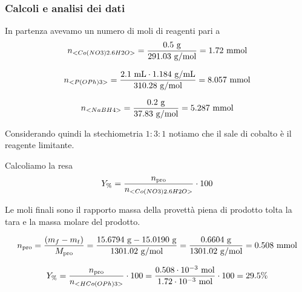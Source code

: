 \subsubsection{Calcoli e analisi dei dati}



In partenza avevamo un numero di moli di reagenti pari a
\[ n_{<Co(NO3)2.6H2O>}=\frac{0.5 \mathrm{~g}}{291.03 \mathrm{~g} / \mathrm{mol}}= 1.72 \mathrm{~mmol} \]

\[ n_{<P(OPh)3>}=\frac{2.1 \mathrm{~mL} \cdot 1.184 \mathrm{~g} / \mathrm{mL} }{310.28 \mathrm{~g} / \mathrm{mol}}= 8.057 \mathrm{~mmol} \]

\[ n_{<NaBH4>}=\frac{0.2 \mathrm{~g}  }{37.83 \mathrm{~g} / \mathrm{mol}}= 5.287 \mathrm{~mmol} \]

Considerando quindi la stechiometria $1: 3: 1$ notiamo che il sale di cobalto è il reagente limitante. 



Calcoliamo la resa 
\[ Y_\% = \frac{n_\text{pro}}{n_{<Co(NO3)2.6H2O>}}\cdot 100 \]

Le moli finali sono il rapporto massa della provettà piena di prodotto tolta la tara e la massa molare del prodotto.

\[ n_\text{pro} = \frac{(m_{f} - m_{t})}{M_\text{pro}} 
 = \frac{ 15.6794 \mathrm{\ g} - 15.0190 \mathrm{\ g} }{ 1301.02 \mathrm{\ g/mol}} =  \frac{0.6604 \mathrm{~g}}{1301.02 \mathrm{~g} / \mathrm{mol}}=0.508 \mathrm{\ mmol}\]

\[ Y_\% = \frac{n_\text{pro}}{n_{<HCo(OPh)3>}}\cdot 100  = \frac{  0.508 \cdot 10^{-3} \mathrm{~mol}}{1.72 \cdot 10^{-3} \mathrm{~mol}} \cdot 100 =29.5\%\]

